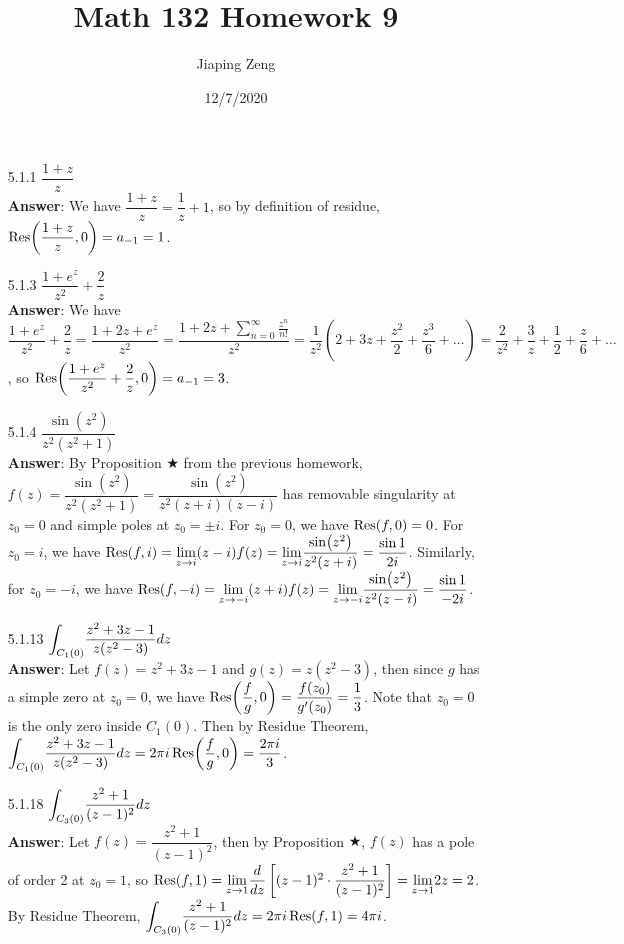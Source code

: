 \documentclass{article}
\title{Math 132 Homework 9}
\date{12/7/2020}
\author{Jiaping Zeng}
\begin{document}
\maketitle

\begin{itemize}
      \item [5.1.1] $\dfrac{1+z}{z}$\\
            \textbf{Answer}: We have $\dfrac{1+z}{z}=\dfrac{1}{z}+1$, so by definition of residue, $\Res(\dfrac{1+z}{z},0)=a_{-1}=1$.
      \item [5.1.3] $\dfrac{1+e^z}{z^2}+\dfrac{2}{z}$\\
            \textbf{Answer}: We have $\dfrac{1+e^z}{z^2}+\dfrac{2}{z}=\dfrac{1+2z+e^z}{z^2}=\dfrac{1+2z+\sum_{n=0}^\infty\frac{z^n}{n!}}{z^2}=\dfrac{1}{z^2}(2+3z+\dfrac{z^2}{2}+\dfrac{z^3}{6}+\ldots)=\dfrac{2}{z^2}+\dfrac{3}{z}+\dfrac{1}{2}+\dfrac{z}{6}+\ldots$, so $\Res(\dfrac{1+e^z}{z^2}+\dfrac{2}{z},0)=a_{-1}=3$.
      \item [5.1.4] $\dfrac{\sin(z^2)}{z^2(z^2+1)}$\\
            \textbf{Answer}: By Proposition $\bigstar$ from the previous homework, $f(z)=\dfrac{\sin(z^2)}{z^2(z^2+1)}=\dfrac{\sin(z^2)}{z^2(z+i)(z-i)}$ has removable singularity at $z_0=0$ and simple poles at $z_0=\pm i$. For $z_0=0$, we have $\Res(f,0)=0$. For $z_0=i$, we have $\Res(f,i)=\mathlarger{\lim_{z\rightarrow i}}(z-i)f(z)=\mathlarger{\lim_{z\rightarrow i}}\dfrac{\sin(z^2)}{z^2(z+i)}=\dfrac{\sin 1}{2i}$. Similarly, for $z_0=-i$, we have $\Res(f,-i)=\mathlarger{\lim_{z\rightarrow -i}}(z+i)f(z)=\mathlarger{\lim_{z\rightarrow -i}}\dfrac{\sin(z^2)}{z^2(z-i)}=\dfrac{\sin 1}{-2i}$.
      \item [5.1.13] $\mathlarger{\int_{C_1(0)}}\dfrac{z^2+3z-1}{z(z^2-3)}dz$\\
            \textbf{Answer}: Let $f(z)=z^2+3z-1$ and $g(z)=z(z^2-3)$, then since $g$ has a simple zero at $z_0=0$, we have $\Res(\dfrac{f}{g},0)=\dfrac{f(z_0)}{g'(z_0)}=\dfrac{1}{3}$. Note that $z_0=0$ is the only zero inside $C_1(0)$. Then by Residue Theorem, $\mathlarger{\int_{C_1(0)}}\dfrac{z^2+3z-1}{z(z^2-3)}dz=2\pi i\Res(\dfrac{f}{g},0)=\dfrac{2\pi i}{3}$.
      \item [5.1.18] $\mathlarger{\int_{C_3(0)}}\dfrac{z^2+1}{(z-1)^2}dz$\\
            \textbf{Answer}: Let $f(z)=\dfrac{z^2+1}{(z-1)^2}$, then by Proposition $\bigstar$, $f(z)$ has a pole of order 2 at $z_0=1$, so $\Res(f,1)=\mathlarger{\lim_{z\rightarrow 1}}\dfrac{d}{dz}\left[(z-1)^2\cdot\dfrac{z^2+1}{(z-1)^2}\right]=\mathlarger{\lim_{z\rightarrow 1}}2z=2$. By Residue Theorem, $\mathlarger{\int_{C_3(0)}}\dfrac{z^2+1}{(z-1)^2}dz=2\pi i\Res(f,1)=4\pi i$.

\end{itemize}
\end{document}
